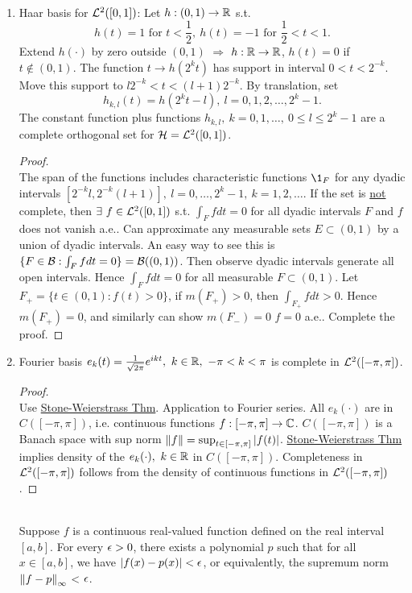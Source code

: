 \begin{examples}\
\begin{enumerate}[label = (\alph*)]
    \item Haar basis for $\mathcal{L}^2([0,1])$: Let $h: (0,1) \to \mathbb{R}$ s.t.
    \begin{equation*}
        h(t) = 1 \text{ for } t < \frac{1}{2},\ h(t) = -1 \text{ for } \frac{1}{2} < t < 1.
    \end{equation*}
     Extend $h(\cdot)$ by zero outside $(0,1)$ $\Rightarrow$ $h: \mathbb{R} \to \mathbb{R}$, $h(t) = 0$ if $t \notin (0,1)$. The function $t \to h(2^k t)$ has support in interval $0 < t < 2^{-k}$. Move this support to $l 2^{-k} < t < (l+1)2^{-k}$. By translation, set 
     $$h_{k,l} (t) = h(2^kt - l),\ l=0,1,2,\dots, 2^k -1.$$ 
     The constant function plus functions $h_{k,l},\ k=0,1,\dots,\ 0 \leq l \leq 2^k-1$ are a complete orthogonal set for $\mathcal{H} = \mathcal{L}^2([0,1])$.
    \begin{proof}\ \\
    The span of the functions includes characteristic functions $\1_F$ for any dyadic intervals $[2^{-k} l, 2^{-k} (l+1)],\ l=0,\dots,2^{k}-1,\ k=1,2,\dots$. If the set is \underline{not} complete, then $\exists\ f \in \mathcal{L}^2([0,1])$ s.t. $\int_F f dt = 0$ for all dyadic intervals $F$ and $f$ does not vanish a.e.. Can approximate any measurable sets $E \subset (0,1)$ by a union of dyadic intervals. An easy way to see this is $\{F \in \mathcal{B}: \int_F f dt = 0\} = \mathcal{B}((0,1))$. Then observe dyadic intervals generate all open intervals. Hence $\int_F f dt = 0$ for all measurable $F \subset (0,1)$. Let $F_+ = \{t \in (0,1): f(t) > 0\}$, if $m(F_+) > 0$, then $\int_{F_+} f dt > 0$. Hence $m(F_+) = 0$, and similarly can show $m(F_-) = 0$ \imply $f = 0$ a.e.. Complete the proof. 
    \end{proof}
    
    \item Fourier basis $e_k(t) = \frac{1}{\sqrt{2\pi}} e^{ikt},\ k \in \mathbb{R},\ -\pi < k < \pi$ is complete in $\mathcal{L}^2([-\pi,\pi])$.
    
    \begin{proof}\ \\
    Use \underline{Stone-Weierstrass Thm}. Application to Fourier series. All $e_k(\cdot)$ are in $C([-\pi,\pi])$, i.e. continuous functions $f: [-\pi,\pi] \to \mathbb{C}$. $C([-\pi,\pi])$ is a Banach space with sup norm $\norm{f} = \sup_{t \in [-\pi,\pi]} \abs{f(t)}$. \underline{Stone-Weierstrass Thm} implies density of the $e_k(\cdot),\ k \in \mathbb{R}$ in $C([-\pi,\pi])$. Completeness in $\mathcal{L}^2([-\pi,\pi])$ follows from the density of continuous functions in $\mathcal{L}^2([-\pi,\pi])$. 
    \end{proof}
    \begin{remark}\ \\
    Suppose $f$ is a continuous real-valued function defined on the real interval $[a, b]$. For every $\epsilon > 0$, there exists a polynomial $p$ such that for all $x \in [a,b]$, we have $\abs{f(x) - p(x)} < \epsilon$, or equivalently, the supremum norm $\norm{f - p}_\infty$ < $\epsilon$.
    \end{remark}
\end{enumerate}
\end{examples}













